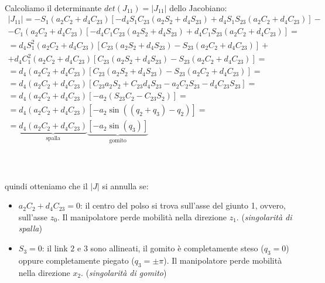 \paragraph{}
Calcoliamo il determinante $det(J_{11}) = \vert J_{11} \vert$ dello Jacobiano:
\begin{align*}
	\vert J_{11} \vert = -S_1(a_2C_2 + d_4C_{23})[-d_4S_1C_{23}(a_2S_2 + d_4S_{23}) + d_4S_1S_{23}(a_2C_2 + d_4C_{23})]- \\ 
	- C_1(a_2C_2 + d_4C_{23})[-d_4C_1C_{23}(a_2S_2 + d_4S_{23}) + d_4C_1S_{23}(a_2C_2 + d_4C_{23})] = \\
	= d_4S_1^2(a_2C_2 + d_4C_{23})[C_{23}(a_2S_2 + d_4S_{23}) - S_{23}(a_2C_2 + d_4C_{23})]+\\
	+ d_4C_1^2(a_2C_2 + d_4C_{23})[C_{23}(a_2S_2 + d_4S_{23}) - S_{23}(a_2C_2 + d_4C_{23})] = \\
	= d_4(a_2C_2 + d_4C_{23})[C_{23}(a_2S_2 + d_4S_{23}) - S_{23}(a_2C_2 + d_4C_{23})] = \\
	= d_4(a_2C_2 + d_4C_{23})[C_{23}a_2S_2 + C_{23}d_4S_{23} - a_2C_2S_{23} - d_4C_{23}S_{23}] = \\
	= d_4(a_2C_2 + d_4C_{23})[-a_2(S_{23}C_{2} - C_{23}S_2)] = \\
	= d_4(a_2C_2 + d_4C_{23})[-a_2\sin((q_2 + q_3) - q_2)] = \\
	= \underbrace{d_4(a_2C_2 + d_4C_{23})}_{\text{spalla}} \underbrace{[-a_2\sin(q_3)]}_{\text{gomito}}
\end{align*}\\\\\\


quindi otteniamo che il $\vert J \vert$ si annulla se:
\begin{itemize}
	\item $a_2C_2 + d_4C_{23} = 0$: il centro del polso si trova sull'asse del giunto 1, ovvero, sull'asse $z_0$. Il manipolatore perde mobilità nella direzione $z_1$. (\emph{singolarità di spalla})
	\item $S_3 = 0$: il link $2$ e $3$ sono allineati, il gomito è completamente steso ($q_3 = 0$) oppure completamente piegato ($q_3 = \pm\pi$). Il manipolatore perde mobilità nella direzione $x_2$. (\emph{singolarità di gomito})
\end{itemize}